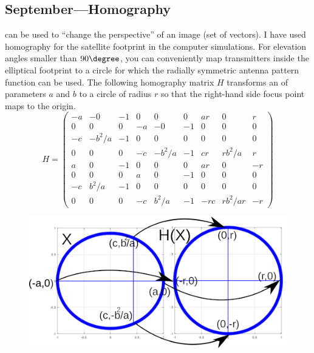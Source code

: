 \documentclass{article}
\begin{document}
\subsection{September---Homography}

 can be used to ``change the perspective'' of an image (set of vectors). I have used homography for the satellite footprint in the computer simulations. For elevation angles smaller than $90 \degree$, you can conveniently map transmitters inside the elliptical footprint to a circle for which the radially symmetric antenna pattern function can be used. The following homography matrix $H$ transforms an  of parameters $a$ and $b$ to a circle of radius $r$ so that the right-hand side focus point maps to the origin.
$$
H=
\begin{pmatrix}
  -a &-0 &-1 &0 &0 &0 &ar &0 &r \\
  0 &0 &0 &-a &-0 &-1 & 0& 0 &0 \\
  -c &-b^2/a& -1& 0& 0& 0 &0& 0& 0 \\
  0 &0 &0 &-c &-b^2/a &-1 &cr &rb^2/a& r\\
  a &0 &-1& 0& 0 &0 & ar &0 &-r \\
  0 &0 &0 &a &0 &-1 &0 &0 &0\\
  -c &b^2/a& -1& 0& 0& 0& 0& 0& 0 \\
  0 &0 &0 &-c &b^2/a &-1 &-rc &rb^2/ar &-r 
\end{pmatrix}
$$

\begin{figure}
  \includegraphics[width=\linewidth]{homographydrawing.png}
\end{figure}
\end{document}
